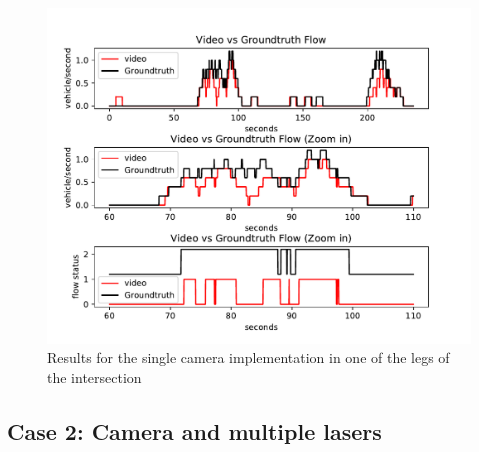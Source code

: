 \begin{figure}[ht!]
\centering
\includegraphics[scale=0.45]{fig/4/video_res.pdf}
\caption{Results for the single camera implementation in one of the legs of the intersection}
\label{video_res}
\end{figure}


\subsection{Case 2: Camera and multiple lasers}

